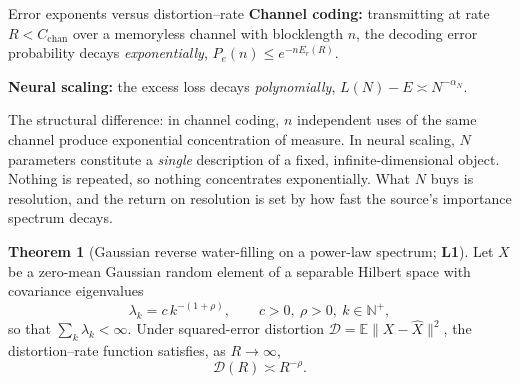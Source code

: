 \documentclass[11pt,a4paper]{article}
\theoremstyle{definition}
\newtheorem{theorem}{Theorem}[section]
\begin{document}
\begin{intuition}{Error exponents versus distortion--rate}
\textbf{Channel coding:} transmitting at rate $R < C_{\mathrm{chan}}$ over a memoryless channel with blocklength $n$, the decoding error probability decays \emph{exponentially}, $P_e(n) \le e^{-n E_r(R)}$.

\textbf{Neural scaling:} the excess loss decays \emph{polynomially}, $L(N)-E \asymp N^{-\alpha_N}$.

The structural difference: in channel coding, $n$ independent uses of the same channel produce exponential concentration of measure. In neural scaling, $N$ parameters constitute a \emph{single} description of a fixed, infinite-dimensional object. Nothing is repeated, so nothing concentrates exponentially. What $N$ buys is resolution, and the return on resolution is set by how fast the source's importance spectrum decays.
\end{intuition}

\begin{theorem}[Gaussian reverse water-filling on a power-law spectrum; \textbf{L1}]
\label{thm:rd}
Let $X$ be a zero-mean Gaussian random element of a separable Hilbert space with covariance eigenvalues
\begin{equation}
  \lambda_k = c\,k^{-(1+\rho)}, \qquad c>0,\ \rho>0,\ k\in\mathbb{N}^+ ,
\end{equation}
so that $\sum_k \lambda_k < \infty$. Under squared-error distortion $\mathcal{D} = \mathbb{E}\|X-\hat X\|^2$, the distortion--rate function satisfies, as $R\to\infty$,
\begin{equation}
  \boxed{\mathcal{D}(R) \asymp R^{-\rho}}.
\end{equation}
\end{theorem}
\end{document}
